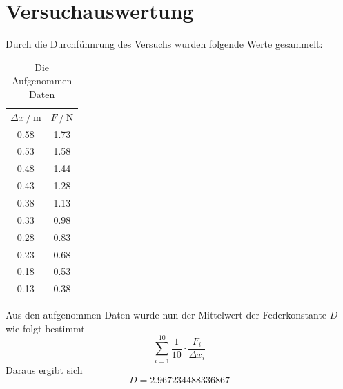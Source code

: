   \section{Versuchauswertung}
Durch die Durchfühnrung des Versuchs wurden folgende Werte gesammelt:
\begin{table}
  \centering
  \caption{Die Aufgenommen Daten}
  \label{tab:Messdaten}
  \begin{tabular}{c c}
  \toprule
  $ \Delta x \:/\: \si{\meter}$ & $F \:/\: \si{\newton}$ \\
  0.58 & 1.73 \\
  0.53 & 1.58 \\
  0.48 & 1.44 \\
  0.43 & 1.28 \\
  0.38 & 1.13 \\
  0.33 & 0.98 \\
  0.28 & 0.83 \\
  0.23 & 0.68 \\
  0.18 & 0.53 \\
  0.13 & 0.38 \\
  \bottomrule
  \end{tabular}
\end{table}
\FloatBarrier
Aus den aufgenommen Daten wurde nun der Mittelwert der Federkonstante $D$ wie folgt bestimmt
\begin{equation}
\sum_{i=1}^{10} \frac{1}{10} \cdot \frac{F_i}{\Delta x_i}
\end{equation}
Daraus ergibt sich
\begin{equation}
D = 2.967234488336867
\end{equation}

